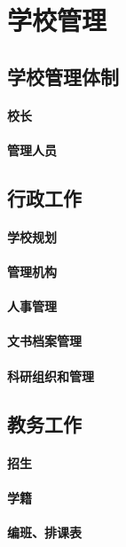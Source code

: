 \documentclass[UTF8]{../../ApplicationUniverse}
\begin{document}
\chapter{学校管理}
\section{学校管理体制}
    \subsubsection{校长}
    \subsubsection{管理人员}
\section{行政工作}
    \subsubsection{学校规划}
    \subsubsection{管理机构}
    \subsubsection{人事管理}
    \subsubsection{文书档案管理}
    \subsubsection{科研组织和管理}
\section{教务工作}
    \subsubsection{招生}
    \subsubsection{学籍}
    \subsubsection{编班、排课表}
\end{document}
